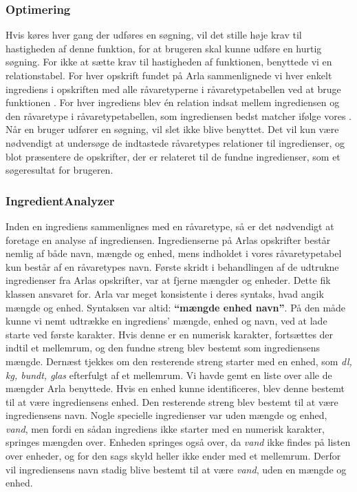 \subsubsection{Optimering}
Hvis  køres hver gang der udføres en søgning, vil det stille høje krav til hastigheden af denne funktion, for at brugeren skal kunne udføre en hurtig søgning. For ikke at sætte krav til hastigheden af funktionen, benyttede vi en relationstabel. For hver opskrift fundet på Arla sammenlignede vi hver enkelt ingrediens i opskriften med alle råvaretyperne i råvaretypetabellen ved at bruge funktionen . For hver ingrediens blev én relation indsat mellem ingrediensen og den råvaretype i råvaretypetabellen, som ingrediensen bedst matcher ifølge vores . Når en bruger udfører en søgning, vil  slet ikke blive benyttet. Det vil kun være nødvendigt at undersøge de indtastede råvaretypes relationer til ingredienser, og blot præsentere de opskrifter, der er relateret til de fundne ingredienser, som et søgeresultat for brugeren.

\subsubsection{IngredientAnalyzer}
Inden en ingrediens sammenlignes med en råvaretype, så er det nødvendigt at foretage en analyse af ingrediensen. Ingredienserne på Arlas opskrifter består nemlig af både navn, mængde og enhed, mens indholdet i vores råvaretypetabel kun består af en råvaretypes navn. Første skridt i behandlingen af de udtrukne ingredienser fra Arlas opskrifter, var at fjerne mængder og enheder. Dette fik klassen  ansvaret for. Arla var meget konsistente i deres syntaks, hvad angik mængde og enhed. Syntaksen var altid: \textbf{``mængde enhed navn''}.
På den måde kunne vi nemt udtrække en ingrediens' mængde, enhed og navn, ved at lade  starte ved første karakter. Hvis denne er en numerisk karakter, fortsættes der indtil et mellemrum, og den fundne streng blev bestemt som ingrediensens mængde. Dernæst tjekkes om den resterende streng starter med en enhed, som \fx \textit{dl, kg, bundt, glas} efterfulgt af et mellemrum. Vi havde gemt en liste over alle de mængder Arla benyttede. Hvis en enhed kunne identificeres, blev denne bestemt til at være ingrediensens enhed. Den resterende streng blev bestemt til at være ingrediensens navn.
Nogle specielle ingredienser var uden mængde og enhed, \fx \textit{vand}, men fordi en sådan ingrediens ikke starter med en numerisk karakter, springes mængden over. Enheden springes også over, da \textit{vand} ikke findes på listen over enheder, og for den sags skyld heller ikke ender med et mellemrum. Derfor vil ingrediensens navn stadig blive bestemt til at være \textit{vand}, uden en mængde og enhed.

